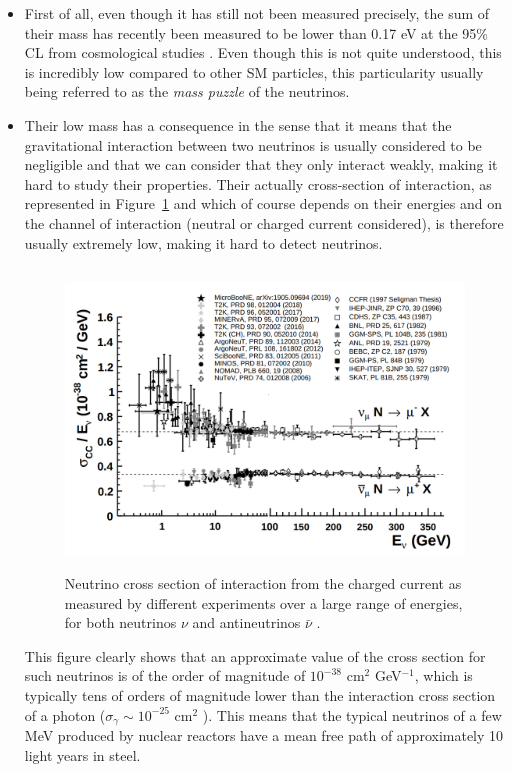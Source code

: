 \documentclass[a4paper, 10pt, openright]{report}
\begin{document}
\begin{itemize}
\item First of all, even though it has still not been measured precisely, the sum of their mass has recently been measured to be lower than 0.17 eV at the 95\% \ac{CL} from cosmological studies \cite{NeutrinoMass}. Even though this is not quite understood, this is incredibly low compared to other \ac{SM} particles, this particularity usually being referred to as the \textit{mass puzzle} of the neutrinos. 

\item Their low mass has a consequence in the sense that it means that the gravitational interaction between two neutrinos is usually considered to be negligible and that we can consider that they only interact weakly, making it hard to study their properties. Their actually cross-section of interaction, as represented in Figure~\ref{fig:NeutrinoXS} and which of course depends on their energies and on the channel of interaction (neutral or charged current considered), is therefore usually extremely low, making it hard to detect neutrinos.

\begin{figure}[htbp]
\begin{center}
\includegraphics[width=12cm, height=8cm]{figs/NeutrinoXS.png}
\caption{Neutrino cross section of interaction from the charged current as measured by different experiments over a large range of energies, for both neutrinos $\nu$ and antineutrinos $\bar \nu$ \cite{PDGNeutrino}.}
\label{fig:NeutrinoXS}
\end{center}
\end{figure}

This figure clearly shows that an approximate value of the cross section for such neutrinos is of the order of magnitude of $10^{-38}$ cm$^2$ GeV$^{-1}$, which is typically tens of orders of magnitude lower than the interaction cross section of a photon ($\sigma_\gamma \sim 10^{-25}$ cm$^2$ \cite{GammaXS}). This means that the typical neutrinos of a few MeV produced by nuclear reactors have a mean free path of approximately 10 light years in steel.  


\end{itemize}
\end{document}
